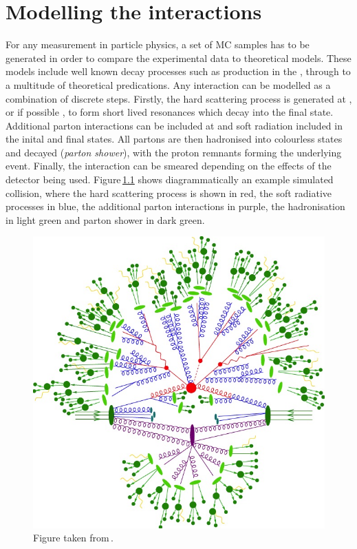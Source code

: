 \chapter{Modelling the interactions}
\label{ch:MC}

For any measurement in particle physics, a set of MC samples has to be generated in order to compare the experimental data to theoretical models.  These models include well known decay processes such as \ttbar{} production in the \SM{}, through to a multitude of theoretical predications. 
Any interaction can be modelled as a combination of discrete steps.
Firstly, the hard scattering process is generated at \LO{}, or if possible \NLO{}, to form short lived resonances which decay into the final state.
Additional parton interactions can be included at \LO{} and soft radiation included in the inital and final states.
All partons are then hadronised into colourless states and decayed (\textit{parton shower}), with the proton remnants forming the underlying event.
Finally, the interaction can be smeared depending on the effects of the detector being used.
Figure\,\ref{fig:GenEvent} shows diagrammatically an example simulated collision, where the hard scattering process is shown in red, the soft radiative processes in blue, the additional parton interactions in purple, the hadronisation in light green and parton shower in dark green.
\begin{figure}[htpb]
	\centering
	\includegraphics[width=\textwidth]{Figures/Generator_Event}
	\caption[ ]{  Figure taken from\,\cite{Gen:Event}.}
	\label{fig:GenEvent}
\end{figure}

